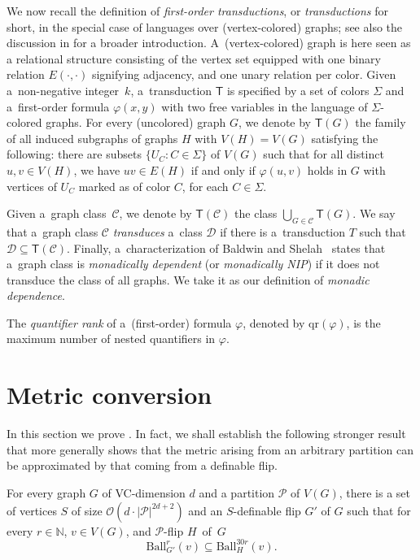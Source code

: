 \documentclass[a4paper,UKenglish,cleveref, autoref, thm-restate]{lipics-v2021}
\renewcommand{\cal}{\mathcal}
\newcommand{\qr}{\mathrm{qr}}
\newcommand{\N}[0]{\mathrm{\mathbb{N}}}
\newcommand{\PP}{\mathcal{P}}
\newcommand{\Ball}{\mathrm{Ball}}
\begin{document}
We now recall the definition of \emph{first-order transductions}, or \emph{transductions} for short, in the special case of languages over (vertex-colored) graphs; see also the discussion in \cite{Pilipczuk25} for a broader introduction.
A~(vertex-colored) graph is here seen as a relational structure consisting of the vertex set equipped with one binary relation $E(\cdot, \cdot)$ signifying adjacency, and one unary relation per color.
Given a~non-negative integer~$k$, a~transduction $\mathsf T$ is specified by a set of colors $\Sigma$ and a~first-order formula $\varphi(x,y)$ with two free variables in the language of $\Sigma$-colored graphs.
For every (uncolored) graph $G$, we denote by $\mathsf T(G)$ the family of all induced subgraphs of graphs $H$ with $V(H)=V(G)$ satisfying the following: there are subsets $\{U_C\colon C\in \Sigma\}$ of $V(G)$ such that for all distinct $u,v\in V(H)$, we have $uv\in E(H)$ if and only if $\varphi(u,v)$ holds in $G$ with vertices of $U_C$ marked as of color $C$, for each $C\in \Sigma$.

Given a~graph class~$\mathcal C$, we denote by $\mathsf T(\mathcal C)$ the class $\bigcup_{G \in \mathcal C}\mathsf T(G)$.
We say that a~graph class $\mathcal C$ \emph{transduces} a~class $\mathcal D$ if there is a~transduction $T$ such that $\mathcal D \subseteq \mathsf T(\mathcal C)$.
Finally, a~characterization of Baldwin and Shelah~\cite{baldwin-shelah} states that a~graph class is \emph{monadically dependent} (or \emph{monadically NIP}) if it does not transduce the class of all graphs.
We take it as our definition of \emph{monadic dependence}.

The \emph{quantifier rank} of a~(first-order) formula $\varphi$, denoted by $\qr(\varphi)$, is the maximum number of nested quantifiers in $\varphi$.
 
\label{sec:metric-conversion}
\section{Metric conversion}

\newcommand{\diamBound}{3\xspace}
\newcommand{\diamBoundBip}{6\xspace}

In this section we prove . In fact, we shall establish the following stronger result that more generally shows that the metric arising from an arbitrary partition can be approximated by that coming from a definable flip.

\begin{theorem}\label{thm:conversion}
  For every graph $G$ of VC-dimension $d$ and a partition $\PP$ of $V(G)$, there is a set of vertices $S$ of size $\cal{O}(d \cdot |\PP|^{2d+2})$ and an $S$-definable flip $G'$ of $G$ such that for every $r\in\N$, $v \in V(G)$, and $\PP$-flip $H$~of~$G$
  \[
      \Ball^r_{G'}(v) \subseteq 
      \Ball^{30r}_{H}(v).
  \]
\end{theorem}
\end{document}
